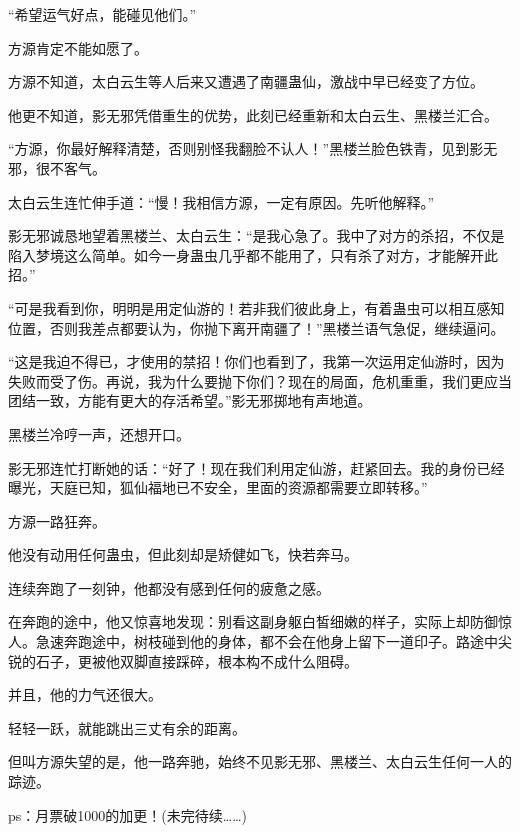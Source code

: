 \begin{this_body}
“希望运气好点，能碰见他们。”

方源肯定不能如愿了。

方源不知道，太白云生等人后来又遭遇了南疆蛊仙，激战中早已经变了方位。

他更不知道，影无邪凭借重生的优势，此刻已经重新和太白云生、黑楼兰汇合。

“方源，你最好解释清楚，否则别怪我翻脸不认人！”黑楼兰脸色铁青，见到影无邪，很不客气。

太白云生连忙伸手道：“慢！我相信方源，一定有原因。先听他解释。”

影无邪诚恳地望着黑楼兰、太白云生：“是我心急了。我中了对方的杀招，不仅是陷入梦境这么简单。如今一身蛊虫几乎都不能用了，只有杀了对方，才能解开此招。”

“可是我看到你，明明是用定仙游的！若非我们彼此身上，有着蛊虫可以相互感知位置，否则我差点都要认为，你抛下离开南疆了！”黑楼兰语气急促，继续逼问。

“这是我迫不得已，才使用的禁招！你们也看到了，我第一次运用定仙游时，因为失败而受了伤。再说，我为什么要抛下你们？现在的局面，危机重重，我们更应当团结一致，方能有更大的存活希望。”影无邪掷地有声地道。

黑楼兰冷哼一声，还想开口。

影无邪连忙打断她的话：“好了！现在我们利用定仙游，赶紧回去。我的身份已经曝光，天庭已知，狐仙福地已不安全，里面的资源都需要立即转移。”

方源一路狂奔。

他没有动用任何蛊虫，但此刻却是矫健如飞，快若奔马。

连续奔跑了一刻钟，他都没有感到任何的疲惫之感。

在奔跑的途中，他又惊喜地发现：别看这副身躯白皙细嫩的样子，实际上却防御惊人。急速奔跑途中，树枝碰到他的身体，都不会在他身上留下一道印子。路途中尖锐的石子，更被他双脚直接踩碎，根本构不成什么阻碍。

并且，他的力气还很大。

轻轻一跃，就能跳出三丈有余的距离。

但叫方源失望的是，他一路奔驰，始终不见影无邪、黑楼兰、太白云生任何一人的踪迹。

ps：月票破1000的加更！(未完待续……)

\end{this_body}

